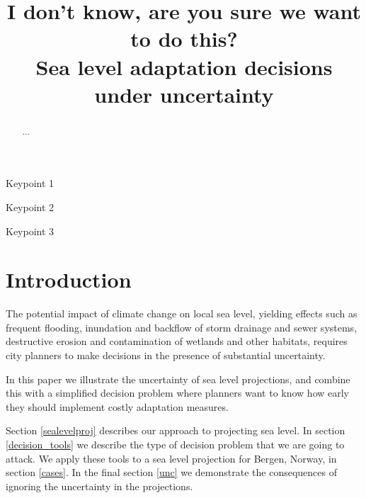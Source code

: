 \documentclass[draft,linenumbers]{agujournal}
\begin{document}
\title{I don't know, are you sure we want to do this?\\
Sea level adaptation decisions under uncertainty}




\begin{keypoints}
\item Keypoint 1
\item Keypoint 2
\item Keypoint 3
\end{keypoints}


\begin{abstract}
...
\end{abstract}




\section{Introduction}\label{sec:intro}
The potential impact of climate change on local sea level, yielding effects such as frequent flooding, inundation and backflow of storm drainage and sewer systems, destructive erosion and contamination of wetlands and other habitats, requires city planners to make decisions in the presence of substantial uncertainty.

In this paper we illustrate the uncertainty of sea level projections, and combine this with a simplified decision problem where planners want to know how early they should implement costly adaptation measures.

Section \ref{sealevelproj} describes our approach to projecting sea level. In section \ref{decision_tools} we describe the type of decision problem that we are going to attack. We apply these tools to a sea level projection for Bergen, Norway, %
in section \ref{cases}.  In the final section \ref{unc}  we demonstrate the consequences of ignoring the uncertainty in the projections.
\end{document}
